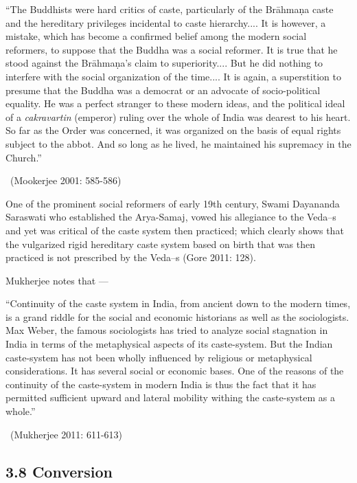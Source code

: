 \begin{myquote}
“The Buddhists were hard critics of caste, particularly of the Brāhmaṇa caste and the hereditary privileges incidental to caste hierarchy.... It is however, a mistake, which has become a confirmed belief among the modern social reformers, to suppose that the Buddha was a social reformer. It is true that he stood against the Brāhmaṇa’s claim to superiority.... But he did nothing to interfere with the social organization of the time.... It is again, a superstition to presume that the Buddha was a democrat or an advocate of socio-political equality. He was a perfect stranger to these modern ideas, and the political ideal of a \textit{cakravartin} (emperor) ruling over the whole of India was dearest to his heart. So far as the Order was concerned, it was organized on the basis of equal rights subject to the abbot. And so long as he lived, he maintained his supremacy in the Church.” 

~\hfill (Mookerjee 2001: 585-586)
\end{myquote}

One of the prominent social reformers of early 19th century, Swami Dayananda Saraswati who established the Arya-Samaj, vowed his allegiance to the Veda--s and yet was critical of the caste system then practiced; which clearly shows that the vulgarized rigid hereditary caste system based on birth that was then practiced is not prescribed by the Veda--s (Gore 2011: 128).

Mukherjee notes that —

\begin{myquote}
“Continuity of the caste system in India, from ancient down to the modern times, is a grand riddle for the social and economic historians as well as the sociologists. Max Weber, the famous sociologists has tried to analyze social stagnation in India in terms of the metaphysical aspects of its caste-system. But the Indian caste-system has not been wholly influenced by religious or metaphysical considerations. It has several social or economic bases. One of the reasons of the continuity of the caste-system in modern India is thus the fact that it has permitted sufficient upward and lateral mobility withing the caste-system as a whole.” 

~\hfill (Mukherjee 2011: 611-613)
\end{myquote}


\subsection*{3.8 Conversion}

